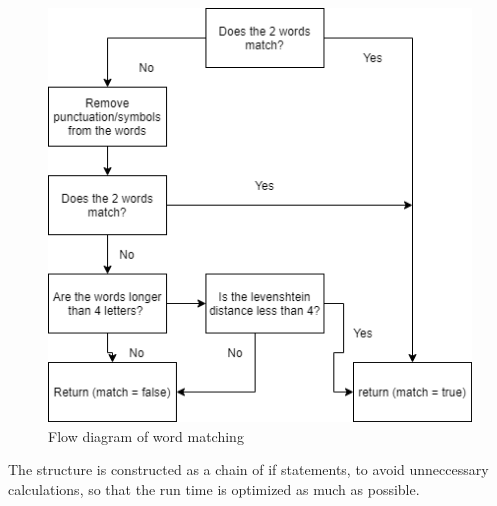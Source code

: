 \begin{figure}[H]
  \centering
  \includegraphics[scale = 0.6]{figures/is_match}
  \caption{Flow diagram of word matching}
\end{figure}

The structure is constructed as a chain of if statements, to avoid unneccessary
calculations, so that the run time is optimized as much as possible.\\
